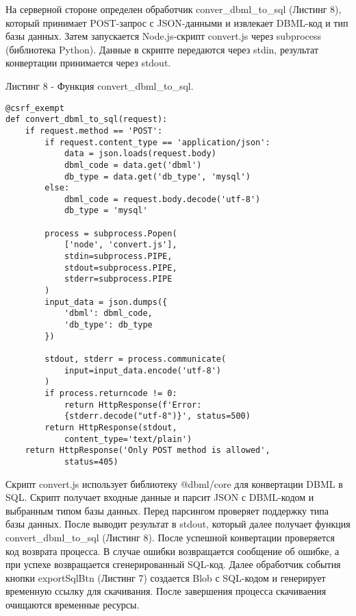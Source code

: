 На серверной стороне определен обработчик conver\_dbml\_to\_sql (Листинг 8), который принимает POST-запрос с JSON-данными и извлекает DBML-код и тип базы данных. Затем запускается Node.js-скрипт convert.js через subprocess (библиотека Python). Данные в скрипте передаются через stdin, результат конвертации принимается через stdout.

Листинг 8 - Функция convert\_dbml\_to\_sql.
\begin{lstlisting}[frame=single]
@csrf_exempt
def convert_dbml_to_sql(request):
    if request.method == 'POST':
        if request.content_type == 'application/json':
            data = json.loads(request.body)
            dbml_code = data.get('dbml')
            db_type = data.get('db_type', 'mysql')
        else:
            dbml_code = request.body.decode('utf-8')
            db_type = 'mysql'

        process = subprocess.Popen(
            ['node', 'convert.js'],
            stdin=subprocess.PIPE,
            stdout=subprocess.PIPE,
            stderr=subprocess.PIPE
        )
        input_data = json.dumps({
            'dbml': dbml_code,
            'db_type': db_type
        })

        stdout, stderr = process.communicate(
            input=input_data.encode('utf-8')
        )
        if process.returncode != 0:
            return HttpResponse(f'Error: 
            {stderr.decode("utf-8")}', status=500)
        return HttpResponse(stdout, 
            content_type='text/plain')
    return HttpResponse('Only POST method is allowed', 
            status=405)
\end{lstlisting}

Скрипт convert.js использует библиотеку @dbml/core для конвертации 
DBML в SQL. Скрипт получает входные данные и парсит JSON с DBML-кодом и выбранным типом базы данных. Перед парсингом проверяет поддержку типа базы данных. После выводит результат в stdout, который далее получает функция convert\_dbml\_to\_sql (Листинг 8). После успешной конвертации проверяется код возврата процесса. В случае ошибки возвращается сообщение об ошибке, а при успехе возвращается сгенерированный SQL-код. Далее обработчик события кнопки exportSqlBtn (Листинг 7) создается Blob с SQL-кодом и генерирует временную ссылку для скачивания. После завершения процесса скачиваения очищаются временные ресурсы.